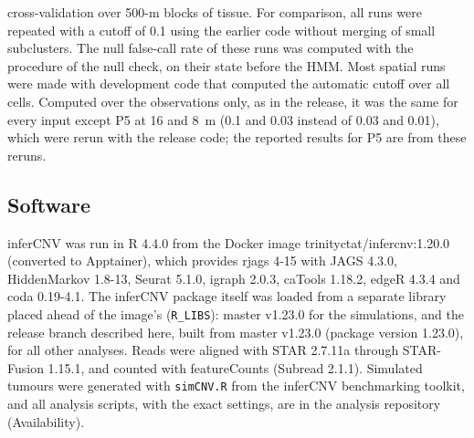 cross-validation over 500-\textmu m blocks of tissue. For comparison, all runs were repeated with a cutoff of 0.1 using the earlier code without merging of small subclusters. The null false-call rate of these runs was computed with the procedure of the null check, on their state before the HMM. Most spatial runs were made with development code that computed the automatic cutoff over all cells. Computed over the observations only, as in the release, it was the same for every input except P5 at 16 and 8~\textmu m (0.1 and 0.03 instead of 0.03 and 0.01), which were rerun with the release code; the reported results for P5 are from these reruns.

\subsection{Software}

inferCNV was run in R 4.4.0 from the Docker image trinityctat/infercnv:1.20.0 (converted to Apptainer), which provides rjags 4-15 with JAGS 4.3.0, HiddenMarkov 1.8-13, Seurat 5.1.0, igraph 2.0.3, caTools 1.18.2, edgeR 4.3.4 and coda 0.19-4.1. The inferCNV package itself was loaded from a separate library placed ahead of the image's (\texttt{R\_LIBS}): master v1.23.0 for the simulations, and the release branch described here, built from master v1.23.0 (package version 1.23.0), for all other analyses. Reads were aligned with STAR 2.7.11a through STAR-Fusion 1.15.1, and counted with featureCounts (Subread 2.1.1). Simulated tumours were generated with \texttt{simCNV.R} from the inferCNV benchmarking toolkit, and all analysis scripts, with the exact settings, are in the analysis repository (Availability).
